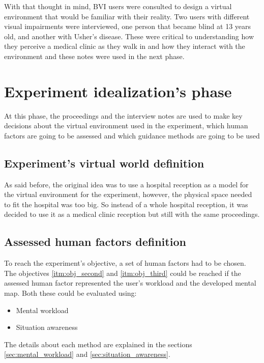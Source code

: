         With that thought in mind, BVI users were consulted to design a virtual environment that would be familiar with their reality. Two users with different visual impairments were interviewed, one person that became blind at 13 years old, and another with Usher's disease. These were critical to understanding how they perceive a medical clinic as they walk in and how they interact with the environment and these notes were used in the next phase.

\section{Experiment idealization's phase}
\label{sec:idealization_phase}
    At this phase, the proceedings and the interview notes are used to make key decisions about the virtual environment used in the experiment, which human factors are going to be assessed and which guidance methods are going to be used
    

    \subsection{Experiment's virtual world definition}
        As said before, the original idea was to use a hospital reception as a model for the virtual environment for the experiment, however, the physical space needed to fit the hospital was too big. So instead of a whole hospital reception, it was decided to use it as a medical clinic reception but still with the same proceedings.

    \subsection{Assessed human factors definition}
	To reach the experiment's objective, a set of human factors had to be chosen. The objectives \ref{itm:obj_second} and \ref{itm:obj_third} could be reached if the assessed human factor represented the user's workload and the developed mental map. Both these could be evaluated using:

        \begin{itemize}
            \item Mental workload
            \item Situation awareness
        \end{itemize}
        
        The details about each method are explained in the sections \ref{sec:mental_workload} and \ref{sec:situation_awareness}.

